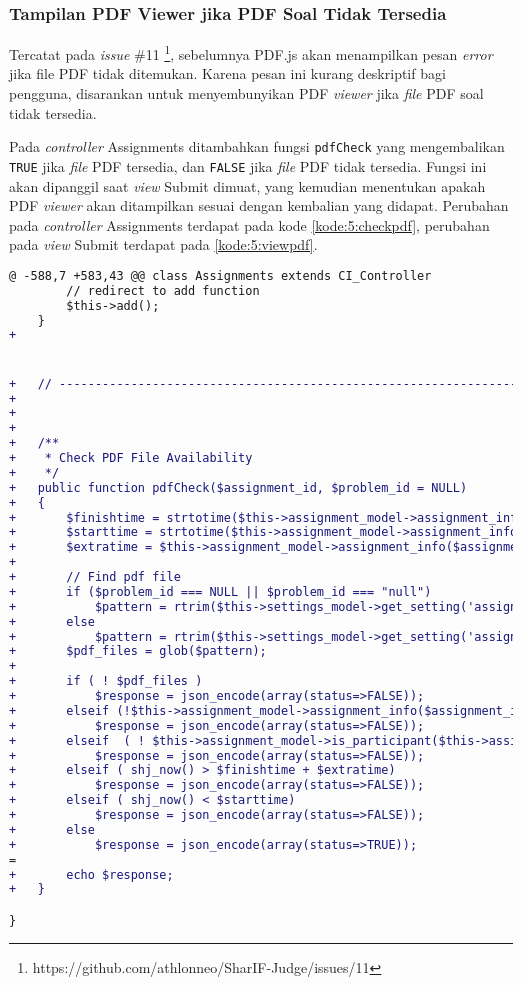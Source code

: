 \subsubsection{Tampilan PDF Viewer jika PDF Soal Tidak Tersedia}
Tercatat pada \textit{issue} \#11 \footnote{https://github.com/athlonneo/SharIF-Judge/issues/11}, sebelumnya PDF.js akan menampilkan pesan \textit{error} jika file PDF tidak ditemukan. Karena pesan ini kurang deskriptif bagi pengguna, disarankan untuk menyembunyikan PDF \textit{viewer} jika \textit{file} PDF soal tidak tersedia.

Pada \textit{controller} Assignments ditambahkan fungsi \verb|pdfCheck| yang mengembalikan \verb|TRUE| jika \textit{file} PDF tersedia, dan \verb|FALSE| jika \textit{file} PDF tidak tersedia. Fungsi ini akan dipanggil saat \textit{view} Submit dimuat, yang kemudian menentukan apakah PDF \textit{viewer} akan ditampilkan sesuai dengan kembalian yang didapat. Perubahan pada \textit{controller} Assignments terdapat pada kode \ref{kode:5:checkpdf}, perubahan pada \textit{view} Submit terdapat pada \ref{kode:5:viewpdf}.

\begin{lstlisting}[language=diff, caption=Perubahan pada \texttt{Assignments.php}, label=kode:5:checkpdf]
@ -588,7 +583,43 @@ class Assignments extends CI_Controller
		// redirect to add function
		$this->add();
	}
+	


+	// ------------------------------------------------------------------------
+
+
+
+	/**
+	 * Check PDF File Availability
+	 */
+	public function pdfCheck($assignment_id, $problem_id = NULL)
+	{
+		$finishtime = strtotime($this->assignment_model->assignment_info($assignment_id)['finish_time']);
+		$starttime = strtotime($this->assignment_model->assignment_info($assignment_id)['start_time']);
+		$extratime = $this->assignment_model->assignment_info($assignment_id)['extra_time'];
+
+		// Find pdf file
+		if ($problem_id === NULL || $problem_id === "null")
+			$pattern = rtrim($this->settings_model->get_setting('assignments_root'),'/')."/assignment_{$assignment_id}/*.pdf";
+		else
+			$pattern = rtrim($this->settings_model->get_setting('assignments_root'),'/')."/assignment_{$assignment_id}/p{$problem_id}/*.pdf";
+		$pdf_files = glob($pattern);
+
+		if ( ! $pdf_files )
+			$response = json_encode(array(status=>FALSE));
+		elseif (!$this->assignment_model->assignment_info($assignment_id)['open'])
+			$response = json_encode(array(status=>FALSE));
+		elseif	( ! $this->assignment_model->is_participant($this->assignment_model->assignment_info($assignment_id)['participants'],$this->user->username) )
+			$response = json_encode(array(status=>FALSE));
+		elseif ( shj_now() > $finishtime + $extratime)
+			$response = json_encode(array(status=>FALSE));
+		elseif ( shj_now() < $starttime)
+			$response = json_encode(array(status=>FALSE));
+		else
+			$response = json_encode(array(status=>TRUE));
=
+		echo $response;
+	}

}
\end{lstlisting}

